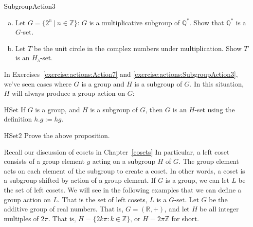 \begin{exercise}{SubgroupAction3}
\begin{enumerate} [(a)]
\item Let $G=\{2^n~|~n \in \mathbb{Z}\}$: $G$ is a multiplicative subgroup of $\mathbb{Q}^*$. Show that $\mathbb{Q}^*$ is a $G$-set.
\item Let $T$ be the unit circle in the complex numbers under multiplication.  Show $T$ is an $H_5$-set.
\end{enumerate}
\end {exercise}

In Exercises~\ref{exercise:actions:Action7} and \ref{exercise:actions:SubgroupAction3}, we've seen cases where $G$ is a group and $H$ is a subgroup of $G$.  In this situation, $H$ will always produce a group action on $G$:

\begin{prop}{HSet} 
If $G$ is a group, and $H$ is a subgroup of $G$, then $G$ is an $H$-set using the definition $h.g:=hg$.
\end{prop}

\begin{exercise}{HSet2} 
Prove the above proposition.
\end {exercise}

Recall our discussion of cosets in Chapter~\ref{cosets} In particular, a left coset consists of a group element $g$ acting on a subgroup $H$ of $G$. The group element acts on each element of the subgroup to create a coset. In other words, a coset is a subgroup shifted by action of a group element.  If $G$ is a group, we can let $L$ be the set of left cosets. We will see in the following examples that we can define a group action on $L$.  That is the set of left cosets, $L$ is a $G$-set.
Let $G$ be the additive group of real numbers.  That is, $G=(\mathbb{R},+)$, and let $H$ be all integer multiples of $2\pi$.   That is, $H=\{2k\pi:k\in \mathbb{Z}\}$, or $H = 2 \pi \mathbb{Z}$ for short.  


